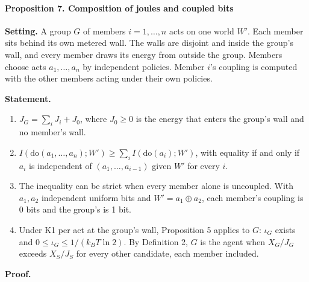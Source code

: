 \documentclass[
  10pt,
]{article}
\providecommand{\tightlist}{%
  \setlength{\itemsep}{0pt}\setlength{\parskip}{0pt}}
\begin{document}
\paragraph{Proposition 7. Composition of joules and coupled
bits}\label{proposition-7.-composition-of-joules-and-coupled-bits}

\textbf{Setting.} A group \(G\) of members \(i = 1, \dots, n\) acts on
one world \(W'\). Each member sits behind its own metered wall. The
walls are disjoint and inside the group's wall, and every member draws
its energy from outside the group. Members choose acts
\(a_1, \dots, a_n\) by independent policies. Member \(i\)'s coupling is
computed with the other members acting under their own policies.

\textbf{Statement.}

\begin{enumerate}
\def\labelenumi{\arabic{enumi}.}
\tightlist
\item
  \(J_G = \sum_i J_i + J_0\), where \(J_0 \ge 0\) is the energy that
  enters the group's wall and no member's wall.
\item
  \(I(\mathrm{do}(a_1,\dots,a_n); W') \ge \sum_i I(\mathrm{do}(a_i); W')\),
  with equality if and only if \(a_i\) is independent of
  \((a_1, \dots, a_{i-1})\) given \(W'\) for every \(i\).
\item
  The inequality can be strict when every member alone is uncoupled.
  With \(a_1, a_2\) independent uniform bits and
  \(W' = a_1 \oplus a_2\), each member's coupling is 0 bits and the
  group's is 1 bit.
\item
  Under K1 per act at the group's wall, Proposition 5 applies to \(G\):
  \(\iota_G\) exists and \(0 \le \iota_G \le 1/(k_BT\ln 2)\). By
  Definition 2, \(G\) is the agent when \(X_G/J_G\) exceeds \(X_S/J_S\)
  for every other candidate, each member included.
\end{enumerate}

\textbf{Proof.}
\end{document}
